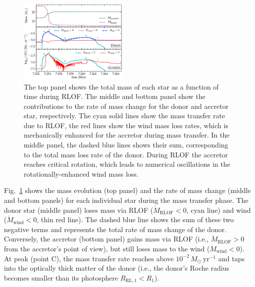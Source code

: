 \documentclass[twocolumn,twocolappendix,trackchanges]{aastex63}
\DeclareRobustCommand{\Figref}[1]{Fig.~\ref{#1}}
\begin{document}
\begin{figure}[bp]
  \includegraphics[width=0.47\textwidth]{MT}
  \caption{The top panel shows the total mass of each star as a
    function of time during RLOF. The middle and bottom panel show the
    contributions to the rate of mass change for the donor and
    accretor star, respectively. The cyan solid lines show the mass
    transfer rate due to RLOF, the red lines show the wind mass loss rates, which is mechanically enhanced for the accretor during mass transfer. In the middle panel, the dashed
    blue lines shows their sum, corresponding to the total mass loss
    rate of the donor. During RLOF the accretor reaches critical
    rotation, which leads to numerical oscillations in the
    rotationally-enhanced wind mass loss.}
  \label{fig:MT}
\end{figure}

\Figref{fig:MT} shows the mass evolution (top panel) and the rate of
mass change (middle and bottom panels) for each individual star during
the mass transfer phase. The donor star (middle panel) loses mass via
RLOF ($\dot M_\mathrm{RLOF}<0$, cyan line) and wind
($\dot M_\mathrm{wind}<0$, thin red line). The dashed blue line shows
the sum of these two negative terms and represents the total rate of
mass change of the donor. Conversely, the accretor (bottom panel)
gains mass via RLOF (i.e., $\dot M_\mathrm{RLOF}>0$ from the
accretor's point of view), but still loses mass to the wind
($\dot M_\mathrm{wind}<0$).
At peak (point C), the mass transfer rate
reaches above $10^{-2}\,M_\odot\ \mathrm{yr^{-1}}$ and taps
into the optically thick matter of the donor (i.e., the donor's Roche
radius becomes smaller than its photosphere $R_\mathrm{RL,1}<R_1$).
\end{document}
